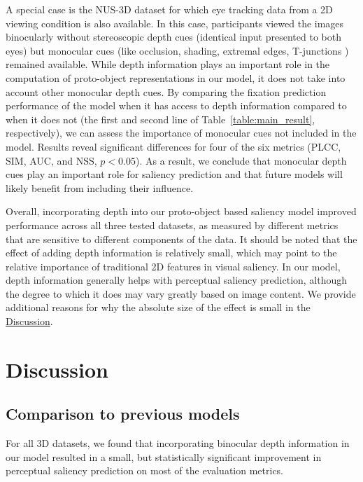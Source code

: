 A special case is the NUS-3D dataset for which eye tracking data from a 2D viewing condition is also available. In this case, participants viewed the images binocularly without stereoscopic depth cues (identical input presented to both eyes) but monocular cues (like occlusion, shading, extremal edges, T-junctions \etc) remained available. While depth information plays an important role in the computation of proto-object representations in our model, it does not take into account other monocular depth cues. By comparing the fixation prediction performance of the model when it has access to depth information compared to when it does not (the first and second line of Table~\ref{table:main_result}, respectively), we can assess the importance of monocular cues not included in the model. Results reveal significant differences for four of the six metrics (PLCC, SIM, AUC, and NSS, $p < 0.05$). As a result, we conclude that monocular depth cues play an important role for saliency prediction and that future models will likely benefit from including their influence.

Overall, incorporating depth into our proto-object based saliency model improved performance across all three tested datasets, as measured by different metrics that are sensitive to different components of the data. It should be noted that the effect of adding depth information is relatively small, which may point to the relative importance of traditional 2D features in visual saliency. In our model, depth information generally helps with perceptual saliency prediction, although the degree to which it does may vary greatly based on image content. We provide additional reasons for why the absolute size of the effect is small in the \hyperref[sec:saliency_discussion]{Discussion}. 

\section{Discussion}
\label{sec:saliency_discussion}

\subsection{Comparison to previous models}

For all 3D datasets, we found that incorporating binocular depth information in our model resulted in a small, but statistically significant improvement in perceptual saliency prediction on most of the evaluation metrics.

